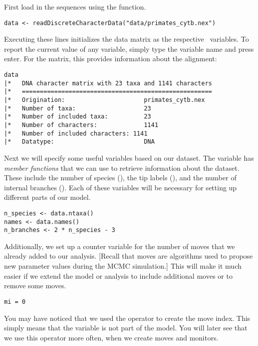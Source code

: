 First load in the sequences using the  function. 
{\tt \begin{snugshade*}
\begin{lstlisting}
data <- readDiscreteCharacterData("data/primates_cytb.nex")
\end{lstlisting}
\end{snugshade*}}
Executing these lines initializes the data matrix as the respective \Rev~variables. 
To report the current value of any variable, simply type the variable name and press enter. For the  matrix, this provides information about the alignment:
{\tt \begin{snugshade*}
\begin{lstlisting}
data
|*   DNA character matrix with 23 taxa and 1141 characters
|*   =====================================================
|*   Origination:                      primates_cytb.nex
|*   Number of taxa:                   23
|*   Number of included taxa:          23
|*   Number of characters:             1141
|*   Number of included characters: 1141
|*   Datatype:                         DNA
\end{lstlisting}
\end{snugshade*}}


Next we will specify some useful variables based on our dataset. The variable  has \textit{member functions} that we can use to retrieve information about the dataset. 
These include the number of species (), the tip labels (), and the number of internal branches ().
Each of these variables will be necessary for setting up different parts of our model.
{\tt \begin{snugshade*}
\begin{lstlisting}
n_species <- data.ntaxa()
names <- data.names()	
n_branches <- 2 * n_species - 3 
\end{lstlisting}
\end{snugshade*}}

Additionally, we set up a counter variable for the number of moves that we already added to our analysis.
[Recall that moves are algorithms used to propose new parameter values during the MCMC simulation.]
This will make it much easier if we extend the model or analysis to include additional moves or to remove some moves.
{\tt \begin{snugshade*}
\begin{lstlisting}
mi = 0 
\end{lstlisting}
\end{snugshade*}}
You may have noticed that we used the \cl{=} operator to create the move index.
This simply means that the variable is not part of the model.
You will later see that we use this operator more often, \EG when we create moves and monitors.

